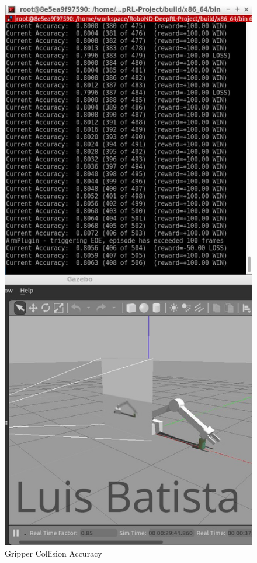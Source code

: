 \documentclass[10pt,journal,compsoc]{IEEEtran}
\begin{document}
\begin{figure}[thpb]
      \centering
      \includegraphics[width=\linewidth]{gripper_collision.png}
      \caption{Gripper Collision Accuracy}
      \label{fig:gripper_collision}
\end{figure}
\end{document}
